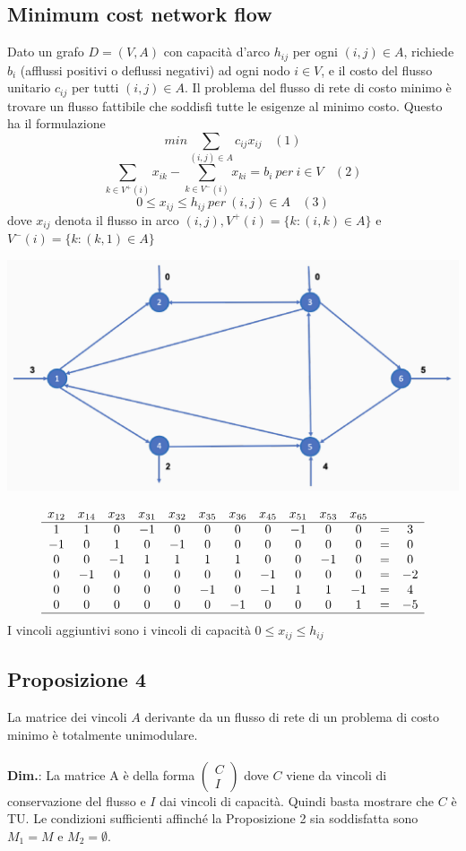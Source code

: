 \documentclass[12pt,a4paper]{article}
\begin{document}
\subsection{Minimum cost network flow}
Dato un grafo $D = (V,A)$ con capacità d'arco $h_{ij}$ per ogni $(i, j) \in A$, richiede $b_i$ (afflussi positivi o deflussi negativi) ad ogni nodo $i \in V$, e il costo del flusso unitario $c_{ij}$ per tutti $(i, j) \in A$. Il problema del flusso di rete di costo minimo è trovare un flusso fattibile che soddisfi tutte le esigenze al minimo costo. Questo ha il formulazione
$$min\sum_{(i,j)\in A} c_{ij}x_{ij} \ \ \ \ (1)$$
$$\sum_{k\in V^+(i)}x_{ik} - \sum_{k \in V^-(i)}x_{ki} = b_i \ per\ i \in V \ \ \ \ (2)$$
$$0\leq x_{ij} \leq h_{ij} \ per \ (i,j)\in A \ \ \ \ (3)$$
dove $x_{ij}$ denota il flusso in arco $(i,j), V^+(i)=\{k:(i,k)\in A\}$ e $V^-(i)=\{k:(k,1) \in A\}$
\begin{center}
\includegraphics[width=0.5\columnwidth]{img/fcm.png}
\end{center}
\begin{equation*}
\begin{array}{ccccccccccccc}
x_{12} & x_{14} & x_{23} & x_{31} & x_{32} & x_{35} & x_{36} & x_{45} & x_{51} & x_{53} & x_{65} & &\\ \hline
1 & 1 & 0 & -1 & 0 & 0 & 0 & 0 & -1 & 0 & 0 & = & 3\\
-1 & 0 & 1 & 0 & -1 & 0 & 0 & 0 & 0 & 0 & 0 & = & 0\\
0 & 0 & -1 & 1 & 1 & 1 & 1 & 0 & 0 & -1 & 0 & = & 0\\
0 & -1 & 0 & 0 & 0 & 0 & 0 & -1 & 0 & 0 & 0 & = & -2\\
0 & 0 & 0 & 0 & 0 & -1 & 0 & -1 & 1 & 1 & -1 & = & 4\\
0 & 0 & 0 & 0 & 0 & 0 & -1 & 0 & 0 & 0 & 1 & = & -5\\
\hline
\end{array}
\end{equation*}
I vincoli aggiuntivi sono i vincoli di capacità $0 \leq x_{ij} \leq h_{ij}$

\subsection{Proposizione 4}
La matrice dei vincoli $A$ derivante da un flusso di rete di un problema di costo minimo è totalmente unimodulare.\\
\\
\textbf{Dim.}: La matrice A è della forma $\left(\begin{array}{c}C\\I\end{array}\right)$ dove $C$ viene da vincoli di conservazione del flusso e $I$ dai vincoli di capacità. Quindi basta mostrare che $C$ è TU. Le condizioni sufficienti affinché la Proposizione 2 sia soddisfatta sono $M_1 = M$ e $M_2 = \emptyset$.
\end{document}
